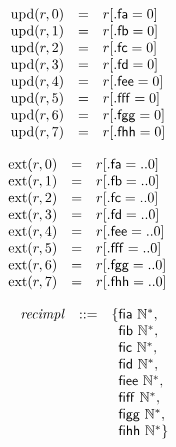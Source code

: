 $$
\begin{array}{@{}lcl@{}l@{}}
{\mathrm{upd}}(r, 0) &=& r{}[{.}\mathsf{fa} = 0] \\
{\mathrm{upd}}(r, 1) &=& r{}[{.}\mathsf{fb} = 0] \\
{\mathrm{upd}}(r, 2) &=& r{}[{.}\mathsf{fc} = 0] \\
{\mathrm{upd}}(r, 3) &=& r{}[{.}\mathsf{fd} = 0] \\
{\mathrm{upd}}(r, 4) &=& r{}[{.}\mathsf{fee} = 0] \\
{\mathrm{upd}}(r, 5) &=& r{}[{.}\mathsf{fff} = 0] \\
{\mathrm{upd}}(r, 6) &=& r{}[{.}\mathsf{fgg} = 0] \\
{\mathrm{upd}}(r, 7) &=& r{}[{.}\mathsf{fhh} = 0] \\
\end{array}
$$

$$
\begin{array}{@{}lcl@{}l@{}}
{\mathrm{ext}}(r, 0) &=& r{}[{.}\mathsf{fa} = ..0] \\
{\mathrm{ext}}(r, 1) &=& r{}[{.}\mathsf{fb} = ..0] \\
{\mathrm{ext}}(r, 2) &=& r{}[{.}\mathsf{fc} = ..0] \\
{\mathrm{ext}}(r, 3) &=& r{}[{.}\mathsf{fd} = ..0] \\
{\mathrm{ext}}(r, 4) &=& r{}[{.}\mathsf{fee} = ..0] \\
{\mathrm{ext}}(r, 5) &=& r{}[{.}\mathsf{fff} = ..0] \\
{\mathrm{ext}}(r, 6) &=& r{}[{.}\mathsf{fgg} = ..0] \\
{\mathrm{ext}}(r, 7) &=& r{}[{.}\mathsf{fhh} = ..0] \\
\end{array}
$$

$$
\begin{array}{@{}lrrl@{}l@{}}
& {\mathit{recimpl}} &::=& \{ \begin{array}[t]{@{}l@{}l@{}}
\mathsf{fia}~{\mathbb{N}^\ast},\; \\
  \mathsf{fib}~{\mathbb{N}^\ast},\; \\
  \mathsf{fic}~{\mathbb{N}^\ast},\; \\
  \mathsf{fid}~{\mathbb{N}^\ast},\; \\
  \mathsf{fiee}~{\mathbb{N}^\ast},\; \\
  \mathsf{fiff}~{\mathbb{N}^\ast},\; \\
  \mathsf{figg}~{\mathbb{N}^\ast},\; \\
  \mathsf{fihh}~{\mathbb{N}^\ast} \}\end{array} \\
\end{array}
$$

